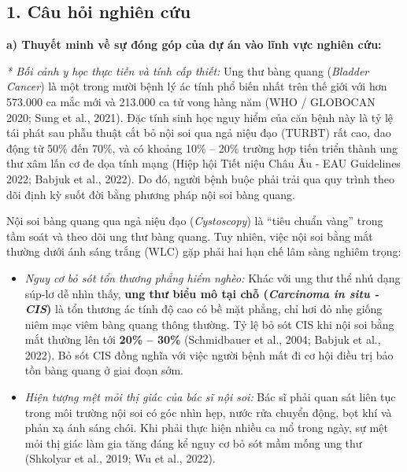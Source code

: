 \documentclass[a4paper]{article}
\begin{document}
\newpage
\setcounter{page}{1}

\vspace{4pt}

\vspace{4pt}

\subsection*{1. Câu hỏi nghiên cứu}

\noindent\textbf{a) Thuyết minh về sự đóng góp của dự án vào lĩnh vực nghiên cứu:}

\textit{* Bối cảnh y học thực tiễn và tính cấp thiết:}
Ung thư bàng quang (\textit{Bladder Cancer}) là một trong mười bệnh lý ác tính phổ biến nhất trên thế giới với hơn 573.000 ca mắc mới và 213.000 ca tử vong hàng năm (WHO / GLOBOCAN 2020; Sung et al., 2021). Đặc tính sinh học nguy hiểm của căn bệnh này là tỷ lệ tái phát sau phẫu thuật cắt bỏ nội soi qua ngả niệu đạo (TURBT) rất cao, dao động từ 50\% đến 70\%, và có khoảng 10\% -- 20\% trường hợp tiến triển thành ung thư xâm lấn cơ đe dọa tính mạng (Hiệp hội Tiết niệu Châu Âu - EAU Guidelines 2022; Babjuk et al., 2022). Do đó, người bệnh buộc phải trải qua quy trình theo dõi định kỳ suốt đời bằng phương pháp nội soi bàng quang.

Nội soi bàng quang qua ngả niệu đạo (\textit{Cystoscopy}) là ``tiêu chuẩn vàng'' trong tầm soát và theo dõi ung thư bàng quang. Tuy nhiên, việc nội soi bằng mắt thường dưới ánh sáng trắng (WLC) gặp phải hai hạn chế lâm sàng nghiêm trọng:
\begin{itemize}
  \item \textit{Nguy cơ bỏ sót tổn thương phẳng hiểm nghèo:} Khác với ung thư thể nhú dạng súp-lơ dễ nhìn thấy, \textbf{ung thư biểu mô tại chỗ (\textit{Carcinoma in situ - CIS})} là tổn thương ác tính độ cao có bề mặt phẳng, chỉ hơi đỏ nhẹ giống niêm mạc viêm bàng quang thông thường. Tỷ lệ bỏ sót CIS khi nội soi bằng mắt thường lên tới \textbf{20\% -- 30\%} (Schmidbauer et al., 2004; Babjuk et al., 2022). Bỏ sót CIS đồng nghĩa với việc người bệnh mất đi cơ hội điều trị bảo tồn bàng quang ở giai đoạn sớm.
  \item \textit{Hiện tượng mệt mỏi thị giác của bác sĩ nội soi:} Bác sĩ phải quan sát liên tục trong môi trường nội soi có góc nhìn hẹp, nước rửa chuyển động, bọt khí và phản xạ ánh sáng chói. Khi phải thực hiện nhiều ca mổ trong ngày, sự mệt mỏi thị giác làm gia tăng đáng kể nguy cơ bỏ sót mầm mống ung thư (Shkolyar et al., 2019; Wu et al., 2022).
\end{itemize}
\end{document}
